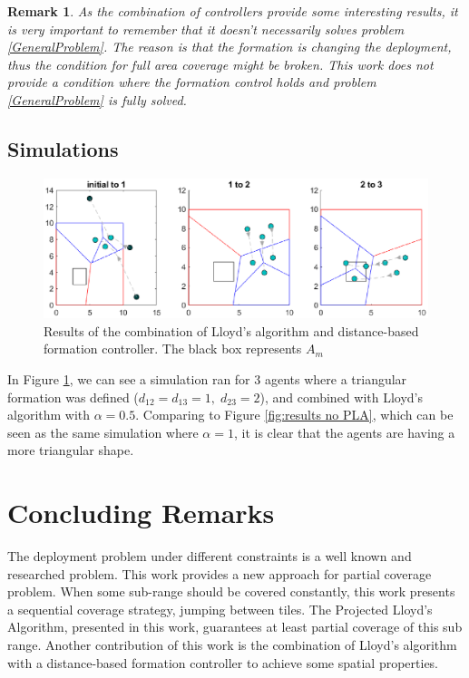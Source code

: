 \documentclass{iacas}
\newtheorem{remark}{Remark}
\begin{document}

\begin{remark}As the combination of controllers provide some interesting results, it is very important to remember that it doesn't necessarily solves problem \ref{GeneralProblem}. The reason is that the formation is changing the deployment, thus the condition for full area coverage might be broken. This work \emph{does not} provide a condition where the formation control holds \emph{and} problem \ref{GeneralProblem} is fully solved.
\end{remark}
\subsection{Simulations}

\begin{figure}[H]
\includegraphics[scale=0.8]{figures/proposed-sol/results/sim3-3agents-3partitions-noPLA-formation.eps}
\caption{Results of the combination of Lloyd's algorithm and distance-based formation controller. The black box represents $A_m$}
\label{fig:results formation, no PLA}
\end{figure}

In Figure \ref{fig:results formation, no PLA}, we can see a simulation ran for 3 agents where a triangular formation was defined ($d_{12} = d_{13} = 1,\; d_{23} = 2$), and combined with Lloyd's algorithm with $\alpha = 0.5$. Comparing to Figure \ref{fig:results no PLA}, which can be seen as the same simulation where $\alpha = 1$, it is clear that the agents are having a more triangular shape.

\section{Concluding Remarks}
The deployment problem under different constraints is a well known and researched problem. This work provides a new approach for partial coverage problem. When some sub-range should be covered constantly, this work presents a sequential coverage strategy, jumping between tiles. The Projected Lloyd's Algorithm, presented in this work, guarantees at least partial coverage of this sub range. Another contribution of this work is the combination of Lloyd's algorithm with a distance-based formation controller to achieve some spatial properties.
\end{document}
